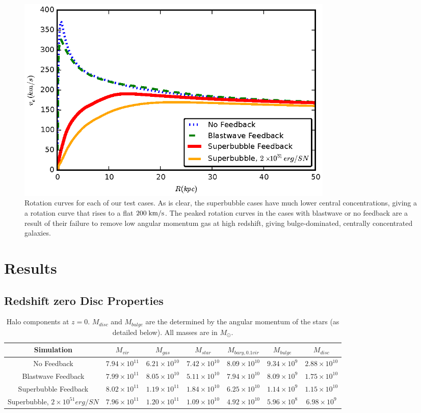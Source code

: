 \begin{figure}
    \includegraphics[width=0.75\textwidth]{figures2/rotation_curve.eps}
    \caption[Rotation curves with different feedback models]{Rotation curves for
    each of our test cases.  As is clear, the superbubble cases have much lower
    central concentrations, giving a a rotation curve that rises to a flat
    $200\; \rm{km/s}$.  The peaked rotation curves in the cases with blastwave
    or no feedback are a result of their failure to remove low angular momentum
    gas at high redshift, giving bulge-dominated, centrally concentrated
    galaxies.}
    \label{rotation_curve2}
\end{figure}

\section{Results}
\subsection{Redshift zero Disc Properties}
\begin{table}
    \scriptsize
    \begin{tabular}{ c c c c c c c}
        \hline
        Simulation & $M_{vir}$ & $M_{gas}$ &
        $M_{star}$  &$M_{bary,0.1vir}$ & $M_{bulge}$ & $M_{disc}$ \\
        \hline
        No Feedback & $7.94\times10^{11}$ & $6.21\times10^{10}$ &
        $7.42\times10^{10}$ & $8.09\times10^{10}$ & $9.34\times10^{9}$ &
        $2.88\times10^{10}$\\
        Blastwave Feedback & $7.99\times10^{11}$ & $8.05\times10^{10}$ &
        $5.11\times10^{10}$ & $7.94\times10^{10}$ & $8.09\times10^{9}$ &
        $1.75\times10^{10}$ \\
        Superbubble Feedback & $8.02\times10^{11}$ & $1.19\times10^{11}$ &
        $1.84\times10^{10}$ & $6.25\times10^{10}$ & $1.14\times10^{9}$ &
        $1.15\times10^{10}$ \\
        Superbubble, $2\times10^{51} erg/SN$ & $7.96\times10^{11}$ &
        $1.20\times10^{11}$ & $1.09\times10^{10}$ &  $4.92\times10^{10}$ & 
        $5.96\times10^{8}$ & $6.98\times10^9$\\
    \end{tabular}
    \caption[Halo Components at $z=0$ for different feedback models]{Halo
    components at $z=0$. $M_{disc}$ and $M_{bulge}$ are the determined by the
    angular momentum of the stars (as detailed below).  All masses are in
    $M_\odot$.}
    \label{properties2}
\end{table}

